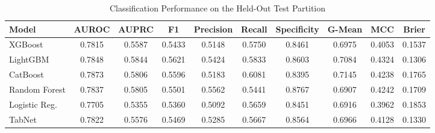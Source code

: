 \begin{table}
\centering
\caption{Classification Performance on the Held-Out Test Partition}
\label{tab:results}
\begin{tabular}{lccccccccc}
\toprule
Model & AUROC & AUPRC & F1 & Precision & Recall & Specificity & G-Mean & MCC & Brier \\
\midrule
XGBoost & 0.7815 & 0.5587 & 0.5433 & 0.5148 & 0.5750 & 0.8461 & 0.6975 & 0.4053 & 0.1537 \\
LightGBM & 0.7848 & 0.5844 & 0.5621 & 0.5424 & 0.5833 & 0.8603 & 0.7084 & 0.4324 & 0.1306 \\
CatBoost & 0.7873 & 0.5806 & 0.5596 & 0.5183 & 0.6081 & 0.8395 & 0.7145 & 0.4238 & 0.1765 \\
Random Forest & 0.7837 & 0.5805 & 0.5501 & 0.5562 & 0.5441 & 0.8767 & 0.6907 & 0.4242 & 0.1709 \\
Logistic Reg. & 0.7705 & 0.5355 & 0.5360 & 0.5092 & 0.5659 & 0.8451 & 0.6916 & 0.3962 & 0.1853 \\
TabNet & 0.7822 & 0.5576 & 0.5469 & 0.5285 & 0.5667 & 0.8564 & 0.6966 & 0.4128 & 0.1330 \\
\bottomrule
\end{tabular}
\end{table}
